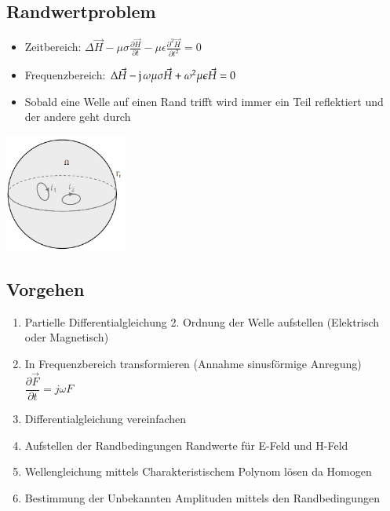 \subsection{Randwertproblem}
\begin{minipage}{9cm}
	\begin{itemize}
		\item Zeitbereich: $\Delta\vec{H}-\mu\sigma\frac{\partial \vec{H}}{\partial t}-\mu\epsilon\frac{\partial^{2}\vec{H}}{\partial t^{2}}=0$
		\item Frequenzbereich: $\Delta \vec{H}-\imaginär\omega\mu\sigma\vec{H}+\omega^{2}\mu\epsilon\vec{H}=0$
		\item Sobald eine Welle auf einen Rand trifft wird immer ein Teil reflektiert und der andere geht durch
	\end{itemize}	
\end{minipage}
\begin{minipage}{8cm}
	\includegraphics[width=4cm]{images/Randwertproblem.jpg}
\end{minipage}
\subsection{Vorgehen}
	\begin{enumerate}
		\item Partielle Differentialgleichung 2. Ordnung der Welle aufstellen (Elektrisch oder Magnetisch)
		\item In Frequenzbereich transformieren (Annahme sinusförmige Anregung)
		\subitem $\dfrac{\partial \vec{F}}{\partial t}= j\omega F $
		\item Differentialgleichung vereinfachen
		\item Aufstellen der Randbedingungen
		\subitem Randwerte für E-Feld und H-Feld
		\item Wellengleichung mittels Charakteristischem Polynom lösen da Homogen
		\item Bestimmung der Unbekannten Amplituden mittels den Randbedingungen
	\end{enumerate}
\clearpage
\pagebreak
